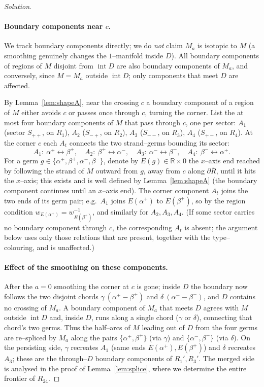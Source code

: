 \documentclass{amsart}
\theoremstyle{definition}
\newcommand{\RR}{\mathbb{R}}
\newcommand{\bdy}{\partial}
\begin{document}
\begin{proof}[Solution]
\paragraph{Boundary components near $c$.}
We track boundary components directly; we do \emph{not} claim $M_a$ is isotopic to $M$ (a
smoothing genuinely changes the $1$--manifold inside $D$). All boundary components of regions of
$M$ disjoint from $\operatorname{int}D$ are also boundary components of $M_a$, and conversely,
since $M=M_a$ outside $\operatorname{int}D$; only components that meet $D$ are affected.

By Lemma~\ref{lem:shapeA}, near the crossing $c$ a boundary component of a region of $M$ either
avoids $c$ or passes once through $c$, turning the corner. List the at most four boundary
components of $M$ that pass through $c$, one per sector:
$A_1$ (sector $S_{++}$, on $R_1$), $A_2$ ($S_{-+}$, on $R_2$), $A_3$ ($S_{--}$, on $R_3$),
$A_4$ ($S_{+-}$, on $R_4$). At the corner $c$ each $A_t$ connects the two strand--germs bounding
its sector:
\[
  A_1:\ \alpha^+\!\leftrightarrow\!\beta^+,\quad
  A_2:\ \beta^+\!\leftrightarrow\!\alpha^-,\quad
  A_3:\ \alpha^-\!\leftrightarrow\!\beta^-,\quad
  A_4:\ \beta^-\!\leftrightarrow\!\alpha^+ .
\]
For a germ $g\in\{\alpha^+,\beta^+,\alpha^-,\beta^-\}$, denote by $E(g)\in\RR\times0$ the
$x$--axis end reached by following the strand of $M$ outward from $g$, away from $c$ along
$\bdy\overline R$, until it hits the $x$--axis; this exists and is well defined by
Lemma~\ref{lem:shapeA} (the boundary component continues until an $x$--axis end). The corner
component $A_t$ joins the two ends of its germ pair; e.g.\ $A_1$ joins $E(\alpha^+)$ to
$E(\beta^+)$, so by the region condition $w_{E(\alpha^+)}=w_{E(\beta^+)}^{-1}$, and similarly for
$A_2,A_3,A_4$. (If some sector carries no boundary component through $c$, the corresponding $A_t$
is absent; the argument below uses only those relations that are present, together with the
type--colouring, and is unaffected.)

\paragraph{Effect of the smoothing on these components.}
After the $a{=}0$ smoothing the corner at $c$ is gone; inside $D$ the boundary now follows the
two disjoint chords $\gamma\ (\alpha^+\!-\!\beta^+)$ and $\delta\ (\alpha^-\!-\!\beta^-)$, and $D$
contains no crossing of $M_a$. A boundary component of $M_a$ that meets $D$ agrees with $M$ outside
$\operatorname{int}D$ and, inside $D$, runs along a single chord ($\gamma$ or $\delta$), connecting
that chord's two germs. Thus the half--arcs of $M$ leading out of $D$ from the four germs are
re--spliced by $M_a$ along the pairs $\{\alpha^+,\beta^+\}$ (via $\gamma$) and
$\{\alpha^-,\beta^-\}$ (via $\delta$). On the persisting side, $\gamma$ recreates $A_1$ (same ends
$E(\alpha^+),E(\beta^+)$) and $\delta$ recreates $A_3$; these are the through--$D$ boundary
components of $R_1',R_3'$. The merged side is analysed in the proof of Lemma~\ref{lem:splice},
where we determine the entire frontier of $R_{24}$.


\end{proof}
\end{document}
